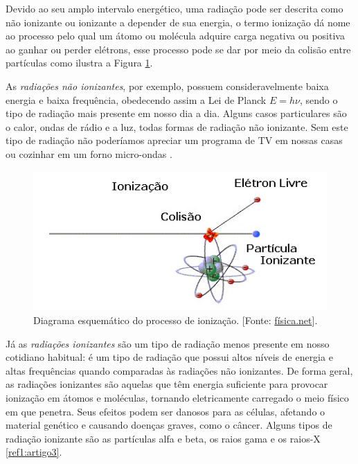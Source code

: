\begin{multicols}{2}
Devido ao seu amplo intervalo energético, uma radiação pode ser descrita como não ionizante ou ionizante a depender de sua energia, o termo ionização dá nome ao processo pelo qual um átomo ou molécula adquire carga negativa ou positiva ao ganhar ou perder elétrons, esse processo pode se dar por meio da colisão entre partículas como ilustra a Figura \ref{fig:ProcessoIonizacao}. 



	
As \textit{radiações não ionizantes}, por exemplo, possuem consideravelmente baixa energia e baixa frequência, obedecendo assim a Lei de Planck $E=h\nu$, sendo o tipo de radiação mais presente em nosso dia a dia. Alguns casos particulares são o calor, ondas de rádio e a luz, todas formas de radiação não ionizante. Sem este tipo de radiação não poderíamos apreciar um programa de TV em nossas casas ou cozinhar em um forno micro-ondas .

\begin{figure}[H]
			\centering
			\includegraphics[width=0.9\linewidth]{Figuras/Artigo3/ionização.jpg}
			\caption{Diagrama esquemático do processo de ionização. [Fonte: \href{https://www.fisica.net/aplicada/biofisica/radiacao.php}{física.net}].}
			\label{fig:ProcessoIonizacao}
\end{figure}



Já as \textit{radiações ionizantes} são um tipo de radiação menos presente em nosso cotidiano habitual: é um tipo de radiação que possui altos níveis de energia e altas frequências quando comparadas às radiações não ionizantes. De forma geral, as radiações ionizantes são aquelas que têm energia suficiente para provocar ionização em átomos e moléculas, tornando eletricamente carregado o meio físico em que penetra. Seus efeitos podem ser danosos para as células, afetando o material genético e causando doenças graves, como o câncer. Alguns tipos de radiação ionizante são as partículas alfa e beta, os raios gama e os raios-X \ref{ref1:artigo3}. 



\end{multicols}

